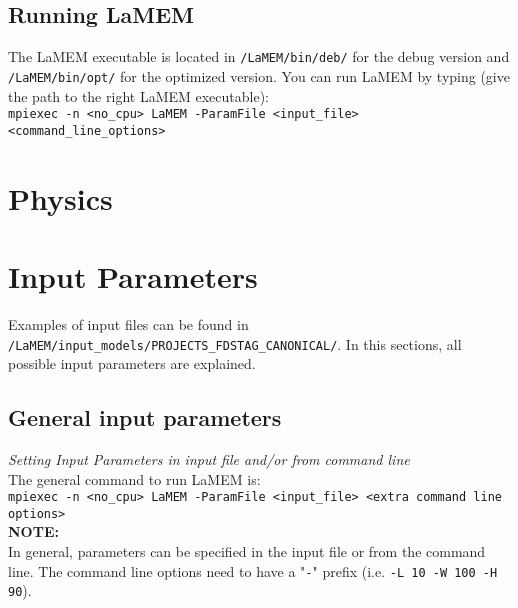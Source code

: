 \documentclass[a4paper,11pt]{article}
\begin{document}
\subsection{Running LaMEM}

The LaMEM executable is located in \texttt{/LaMEM/bin/deb/} for the debug version and \texttt{/LaMEM/bin/opt/} for the optimized version. You can run LaMEM by typing (give the path to the right LaMEM executable):\\
\indent \texttt{mpiexec -n <no\_cpu> LaMEM -ParamFile <input\_file> <command\_line\_options>}\\

\section{Physics}


\newpage
\section{Input Parameters}

Examples of input files can be found in \texttt{/LaMEM/input\_models/PROJECTS\_FDSTAG\_CANONICAL/}. In this sections, all possible input parameters are explained.

\subsection{General input parameters}
\indent \textit{Setting Input Parameters in input file and/or from command line}\\

The general command to run LaMEM is:\\
\indent \texttt{mpiexec -n <no\_cpu> LaMEM -ParamFile <input\_file> <extra command line options>}\\

\textbf{NOTE:}\\
\indent In general, parameters can be specified in the input file or from the command line. The command line options need to have a "\texttt{-}" prefix (i.e. \texttt{-L 10 -W 100 -H 90}). 
\end{document}
